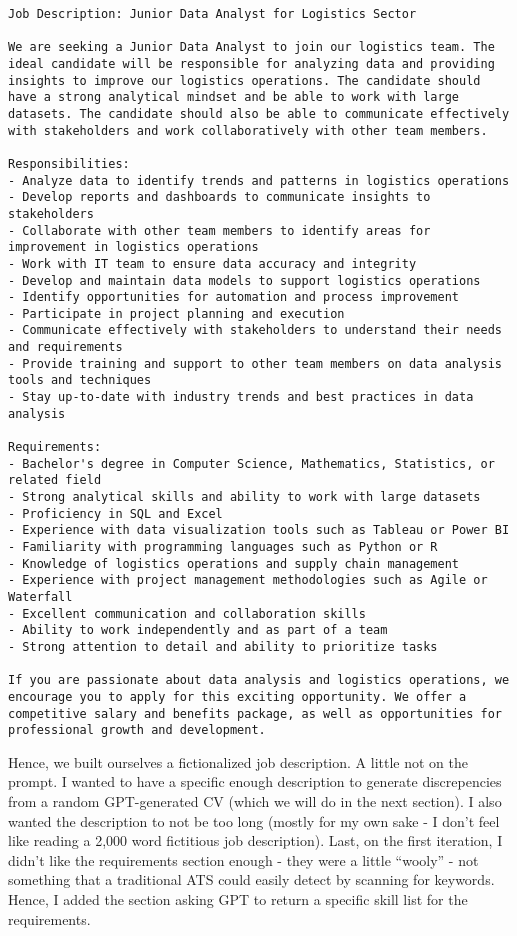 \documentclass[
  letterpaper,
  DIV=11,
  numbers=noendperiod]{scrartcl}
\begin{document}
\begin{verbatim}
Job Description: Junior Data Analyst for Logistics Sector

We are seeking a Junior Data Analyst to join our logistics team. The ideal candidate will be responsible for analyzing data and providing insights to improve our logistics operations. The candidate should have a strong analytical mindset and be able to work with large datasets. The candidate should also be able to communicate effectively with stakeholders and work collaboratively with other team members.

Responsibilities:
- Analyze data to identify trends and patterns in logistics operations
- Develop reports and dashboards to communicate insights to stakeholders
- Collaborate with other team members to identify areas for improvement in logistics operations
- Work with IT team to ensure data accuracy and integrity
- Develop and maintain data models to support logistics operations
- Identify opportunities for automation and process improvement
- Participate in project planning and execution
- Communicate effectively with stakeholders to understand their needs and requirements
- Provide training and support to other team members on data analysis tools and techniques
- Stay up-to-date with industry trends and best practices in data analysis

Requirements:
- Bachelor's degree in Computer Science, Mathematics, Statistics, or related field
- Strong analytical skills and ability to work with large datasets
- Proficiency in SQL and Excel
- Experience with data visualization tools such as Tableau or Power BI
- Familiarity with programming languages such as Python or R
- Knowledge of logistics operations and supply chain management
- Experience with project management methodologies such as Agile or Waterfall
- Excellent communication and collaboration skills
- Ability to work independently and as part of a team
- Strong attention to detail and ability to prioritize tasks

If you are passionate about data analysis and logistics operations, we encourage you to apply for this exciting opportunity. We offer a competitive salary and benefits package, as well as opportunities for professional growth and development.
\end{verbatim}

Hence, we built ourselves a fictionalized job description. A little not
on the prompt. I wanted to have a specific enough description to
generate discrepencies from a random GPT-generated CV (which we will do
in the next section). I also wanted the description to not be too long
(mostly for my own sake - I don't feel like reading a 2,000 word
fictitious job description). Last, on the first iteration, I didn't like
the requirements section enough - they were a little ``wooly'' - not
something that a traditional ATS could easily detect by scanning for
keywords. Hence, I added the section asking GPT to return a specific
skill list for the requirements.
\end{document}

